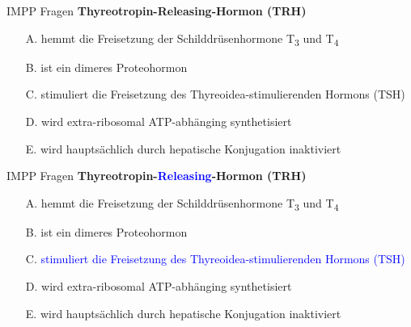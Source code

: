 \documentclass{beamer}
\begin{document}
\begin{frame}{IMPP Fragen}
\textbf{
Thyreotropin-Releasing-Hormon (TRH)} \\[0.2 cm]

\begin{itemize}
\item[A.] hemmt die Freisetzung der Schilddrüsenhormone T\textsubscript{3} und T\textsubscript{4}
\item[B.] ist ein dimeres Proteohormon
\item[C.] stimuliert die Freisetzung des Thyreoidea-stimulierenden Hormons (TSH) %
\item[D.] wird extra-ribosomal ATP-abhänging synthetisiert
\item[E.] wird hauptsächlich durch hepatische Konjugation inaktiviert 

\end{itemize}
    
\end{frame}

\begin{frame}{IMPP Fragen}
\textbf{
Thyreotropin-\textcolor{blue}{Releasing}-Hormon (TRH)} \\[0.2 cm]

\begin{itemize}
\item[A.] hemmt die Freisetzung der Schilddrüsenhormone T\textsubscript{3} und T\textsubscript{4}
\item[B.] ist ein dimeres Proteohormon
\item[C.] \textcolor{blue}{stimuliert die Freisetzung des Thyreoidea-stimulierenden Hormons (TSH)} %
\item[D.] wird extra-ribosomal ATP-abhänging synthetisiert
\item[E.] wird hauptsächlich durch hepatische Konjugation inaktiviert 

\end{itemize}
    
\end{frame}
\end{document}
